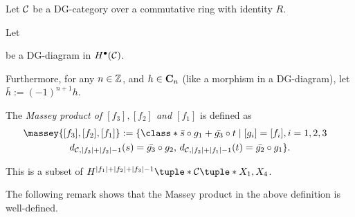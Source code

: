 \begin{definition}
    \label{def:massey_product_dg_cat}
    Let \( {\mathcal{C}} \) be a DG-category over a commutative ring with identity \( R \).

    Let 
    \begin{center}
    \end{center}
    be a DG-diagram in \( H^\bullet({\mathcal{C}}) \).

    Furthermore, for any \( n \in {\mathbb{Z}} \), and \( h \in \operatorname{\mathbf{C}}_n \) (like a morphism in a DG-diagram), let \( \bar{h} := (-1)^{n + 1}h \).

    The \emph{Massey product of \( [f_3], [f_2] \) and \( [f_1] \)} is defined as
    \begin{multline*}
        \massey{[f_3], [f_2], [f_1]} :=
        \{
            \class*{
                \bar{s} \circ g_1 + \bar{g_3} \circ t
            }
            \mid [g_i] = [f_i], i = 1, 2, 3 \quad \\
            d_{\Cc, |f_3| + |f_2| - 1}(s) = \bar{g_3} \circ g_2, \,
            d_{\Cc, |f_2| + |f_1| - 1}(t) = \bar{g_2} \circ g_1
        \}.
    \end{multline*}

    This is a subset of \( H^{|f_1| + |f_2| + |f_3| - 1}\tuple*{\Cc\tuple*{X_1, X_4}} \).
\end{definition}

The following remark shows that the Massey product in the above definition is well-defined.


